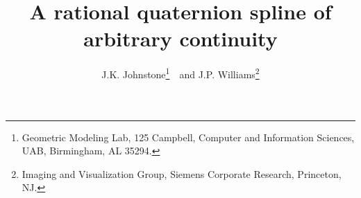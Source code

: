 \newif\ifFull
\Fullfalse

\newcommand{\add}[1]{#1}		%
\DoubleSpace

\setlength{\oddsidemargin}{0pt}
\setlength{\topmargin}{.5in}	%
\setlength{\textheight}{8.5in}
\setlength{\textwidth}{6.5in}
\setlength{\columnsep}{5mm}	%

\title{A rational quaternion spline of arbitrary continuity}
\author{J.K. Johnstone\thanks{Geometric Modeling Lab, 125 Campbell,
	Computer and Information Sciences, 
	UAB, Birmingham, AL 35294.}\ \ and 
	J.P. Williams\thanks{Imaging and Visualization Group,
	Siemens Corporate Research, Princeton, NJ.}}


\maketitle

